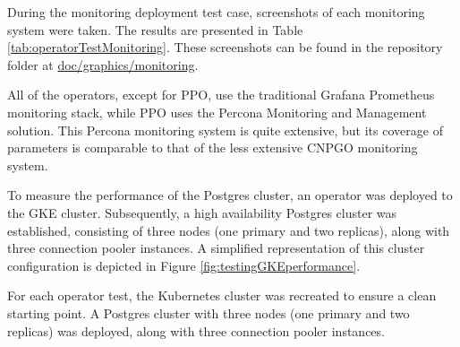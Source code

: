\label{chap:monitoring}
During the monitoring deployment test case, screenshots of each monitoring system were taken. The results are presented in Table \ref{tab:operatorTestMonitoring}.
These screenshots can be found in the repository folder at \url{doc/graphics/monitoring}.

All of the operators, except for PPO, use the traditional Grafana Prometheus monitoring stack, while PPO uses the Percona Monitoring and Management solution.
This Percona monitoring system is quite extensive, but its coverage of parameters is comparable to that of the less extensive CNPGO monitoring system.


\label{chap:performance}
To measure the performance of the Postgres cluster, an operator was deployed to the GKE cluster. Subsequently, a high availability Postgres cluster was established, consisting of three nodes (one primary and two replicas), along with three connection pooler instances.
A simplified representation of this cluster configuration is depicted in Figure \ref{fig:testingGKEperformance}.


For each operator test, the Kubernetes cluster was recreated to ensure a clean starting point. A Postgres cluster with three nodes (one primary and two replicas) was deployed, along with three connection pooler instances.

